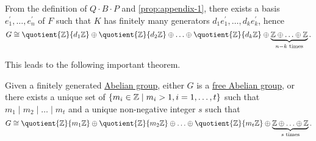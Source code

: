From the definition of \(Q\cdot B\cdot P\) and \autoref{prop:appendix-1}, there exists a basis \(e_1^\prime, \ldots , e_{n} ^\prime  \) of \(F\) such
that \(K\) has finitely many generators \(d_1 e_1^\prime , \ldots , d_{k} e_{k} ^\prime\), hence
\[
	G\cong \quotient{\mathbb{\MakeUppercase{z}} }{d_1 \mathbb{\MakeUppercase{z}} } \oplus \quotient{\mathbb{\MakeUppercase{z}} }{d_2 \mathbb{\MakeUppercase{z}} } \oplus \ldots \oplus \quotient{\mathbb{\MakeUppercase{z}} }{d_k \mathbb{\MakeUppercase{z}} }  \oplus \underbrace{\mathbb{\MakeUppercase{z}} \oplus \ldots \oplus \mathbb{\MakeUppercase{z}}  }_{n-k \text{ times}}.
\]

This leads to the following important theorem.

\begin{theorem}\label{thm:fundamental-theorem-of-finitely-generalted-Abelian-group}
	Given a finitely generated \hyperref[def:Abelian-group]{Abelian group}, either \(G\) is a \hyperref[def:free-Abelian-group]{free Abelian group}, or there exists
	a unique set of \(\{m_{i}\in \mathbb{\MakeUppercase{z}} \mid  m_{i} > 1, i = 1, \ldots , t \}\) such that \(m_1 \mid m_2 \mid \ldots \mid m_t \) and a unique non-negative integer \(s\)
	such that
	\[
		G\cong \quotient{\mathbb{\MakeUppercase{z}} }{m_1 \mathbb{\MakeUppercase{z}} } \oplus \quotient{\mathbb{\MakeUppercase{z}} }{m_2 \mathbb{\MakeUppercase{z}} } \oplus \ldots \oplus \quotient{\mathbb{\MakeUppercase{z}} }{m_t \mathbb{\MakeUppercase{z}} }  \oplus \underbrace{\mathbb{\MakeUppercase{z}} \oplus \ldots \oplus \mathbb{\MakeUppercase{z}}  }_{s \text{ times}}.
	\]
\end{theorem}
